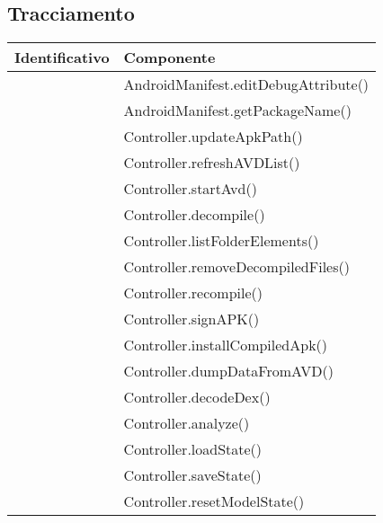 \subsection{Tracciamento}\label{subsec:tracciamento-unitari}
\begin{center}
    \begin{longtable}{ |C{3cm} |C{10.5cm}|}
        \hline
        \textbf{Identificativo} & \textbf{Componente}                        \\\hline
                     & AndroidManifest.editDebugAttribute()       \\\hline
                     & AndroidManifest.getPackageName()           \\\hline
                     & Controller.updateApkPath()                 \\\hline
                     & Controller.refreshAVDList()                \\\hline
                     & Controller.startAvd()                      \\\hline
                     & Controller.decompile()                     \\\hline
                     & Controller.listFolderElements()            \\\hline
                     & Controller.removeDecompiledFiles()         \\\hline
                     & Controller.recompile()                     \\\hline
                     & Controller.signAPK()                       \\\hline
                     & Controller.installCompiledApk()            \\\hline
                     & Controller.dumpDataFromAVD()               \\\hline
                     & Controller.decodeDex()                     \\\hline
                     & Controller.analyze()                       \\\hline
                     & Controller.loadState()                     \\\hline
                     & Controller.saveState()                     \\\hline
                     & Controller.resetModelState()               \\\hline

\end{longtable}
\end{center}
